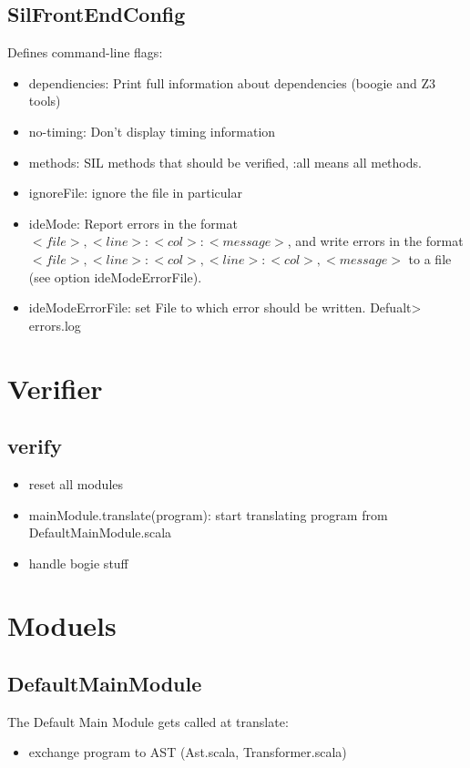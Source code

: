 \documentclass[12pt]{article}
\begin{document}
\subsection{SilFrontEndConfig}
Defines command-line flags:
\begin{itemize}
\item dependiencies: Print full information about dependencies (boogie and Z3 tools)
\item no-timing: Don't display timing information
\item methods: SIL methods that should be verified, :all means all methods.
\item ignoreFile: ignore the file in particular
\item ideMode: Report errors in the format $<file>,<line>:<col>: <message>$, and write errors in the format $<file>,<line>:<col>,<line>:<col>,<message>$ to a file (see option ideModeErrorFile).
\item ideModeErrorFile: set File to which error should be written. Defualt> errors.log
\end{itemize}

\section{Verifier}
\subsection{verify}
\begin{itemize}
\item reset all modules
\item mainModule.translate(program): start translating program from DefaultMainModule.scala
\item handle bogie stuff
\end{itemize}

\section{Moduels}

\subsection{DefaultMainModule}
The Default Main Module gets called at translate:
\begin{itemize}
\item exchange program to AST (Ast.scala, Transformer.scala)
\end{itemize}
\end{document}
